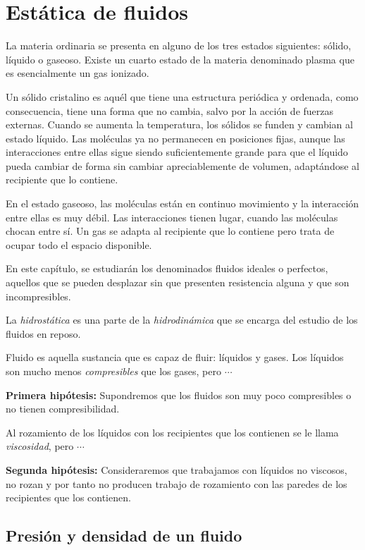 \chapter{Estática de fluidos}	\label{hidrostatica}

\begin{miparrafo}
La materia ordinaria se presenta en alguno de los tres estados siguientes: sólido, líquido o gaseoso. Existe un cuarto estado de la materia denominado plasma que es esencialmente un gas ionizado.

Un sólido cristalino es aquél que tiene una estructura periódica y ordenada, como consecuencia, tiene una forma que no cambia, salvo por la acción de fuerzas externas. Cuando se aumenta la temperatura, los sólidos se funden y cambian al estado líquido. Las moléculas ya no permanecen en posiciones fijas, aunque las interacciones entre ellas sigue siendo suficientemente grande para que el líquido pueda cambiar de forma sin cambiar apreciablemente de volumen, adaptándose al recipiente que lo contiene.

En el estado gaseoso, las moléculas están en continuo movimiento y la interacción entre ellas es muy débil. Las interacciones tienen lugar, cuando las moléculas chocan entre sí. Un gas se adapta al recipiente que lo contiene pero trata de ocupar todo el espacio disponible.

En este capítulo, se estudiarán los denominados fluidos ideales o perfectos, aquellos que se pueden desplazar sin que presenten resistencia alguna	y que son incompresibles.
\end{miparrafo}

La \emph{hidrostática} es una parte de la \emph{hidrodinámica} que se encarga del estudio de los fluidos en reposo.

Fluido es aquella sustancia que es capaz de fluir: líquidos y gases. Los líquidos son mucho menos \emph{compresibles} que los gases, pero $\cdots$

\textbf{Primera hipótesis:} Supondremos que los fluidos son muy poco compresibles o no tienen compresibilidad.

Al rozamiento de los líquidos con los recipientes que los contienen se le llama \emph{viscosidad}, pero $\cdots$

\textbf{Segunda hipótesis:} Consideraremos que trabajamos con líquidos no viscosos, no rozan y por tanto no producen trabajo de rozamiento con las paredes de los recipientes que los contienen.

\section{Presión y densidad de un fluido}

